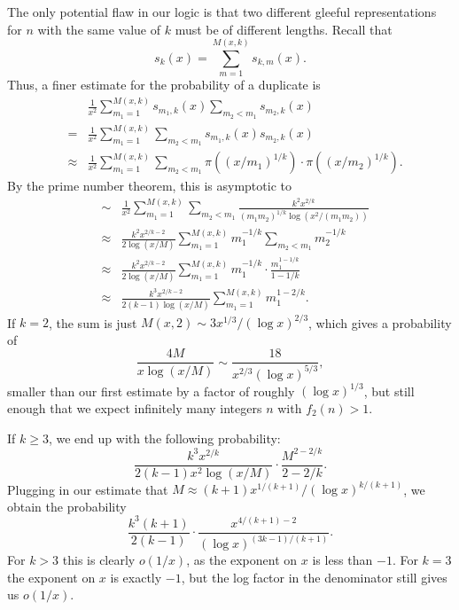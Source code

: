\documentclass[11pt]{amsart}
\newcommand{\sk}{s_k}
\numberwithin{equation}{section}
\numberwithin{algorithm}{section}
\begin{document}
The only potential flaw in our logic is that two different
  gleeful representations for $n$ with the same value of $k$
  must be of different lengths.
Recall that
$$
\sk(x)=\sum_{m=1}^{M(x,k)} s_{k,m}(x).
$$
Thus, a finer estimate for the probability of a duplicate
is
\begin{eqnarray*}
   && \frac{1}{x^2} \sum_{m_1=1}^{M(x,k)} s_{m_1,k}(x)
      \sum_{m_2<m_1} s_{m_2,k}(x)\\
      &=&
      \frac{1}{x^2} \sum_{m_1=1}^{M(x,k)}\sum_{m_2<m_1} s_{m_1,k}(x)
       s_{m_2,k}(x) \\
       &\approx&\frac{1}{x^2} \sum_{m_1=1}^{M(x,k)}\sum_{m_2<m_1}
       \pi( (x/m_1)^{1/k} ) \cdot  \pi( (x/m_2)^{1/k} ).
       \end{eqnarray*}
By the prime number theorem, this is asymptotic to
       \begin{eqnarray*}
       &\sim&\frac{1}{x^2} \sum_{m_1=1}^{M(x,k)}\sum_{m_2<m_1}
       \frac{k^2 x^{2/k}}{(m_1m_2)^{1/k}\log(x^2/(m_1m_2))}\\
       &\approx&
       \frac{k^2 x^{2/k-2}}{2\log(x/M)}
       \sum_{m_1=1}^{M(x,k)}m_1^{-1/k}\sum_{m_2<m_1}m_2^{-1/k}\\
       &\approx&
       \frac{k^2 x^{2/k-2}}{2\log(x/M)}
       \sum_{m_1=1}^{M(x,k)}m_1^{-1/k} \cdot\frac{m_1^{1-1/k}}{1-1/k}\\
        &\approx&
       \frac{k^3 x^{2/k-2}}{2(k-1)\log(x/M)}
       \sum_{m_1=1}^{M(x,k)}m_1^{1-2/k} .
\end{eqnarray*}
If $k=2$, the sum is just $M(x,2)\sim 3x^{1/3}/(\log x)^{2/3}$,
which gives a probability of
$$
\frac{4 M}{x\log(x/M)}
\sim
\frac{18 }{x^{2/3}(\log x)^{5/3}},
$$
smaller than our first estimate by a factor of roughly
$(\log x)^{1/3}$, but still enough that we expect infinitely
many integers $n$ with $f_2(n)>1$.


If $k\ge 3$, we end up with the following probability:
$$
\frac{k^3 x^{2/k}}{2(k-1)x^2\log(x/M)} \cdot
\frac{M^{2-2/k}}{2-2/k}.
$$
Plugging in our estimate that 
$M\approx (k+1)x^{1/(k+1)}/(\log x)^{k/(k+1)}$,
we obtain the probability
$$
\frac{k^3(k+1)}{2(k-1)} \cdot
\frac{x^{4/(k+1)-2}}{(\log x)^{(3k-1)/(k+1)}}.
$$
For $k>3$ this is clearly $o(1/x)$, as the exponent
on $x$ is less than $-1$.
For $k=3$ the exponent on $x$ is exactly $-1$, but the log factor
in the denominator still gives us $o(1/x)$.
\end{document}
